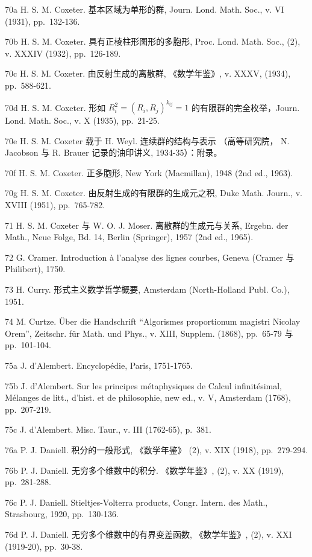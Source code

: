 70a H. S. M. Coxeter. 基本区域为单形的群, Journ. Lond. Math. Soc., v. VI (1931), pp.~132-136.

70b H. S. M. Coxeter. 具有正棱柱形图形的多胞形, Proc. Lond. Math. Soc., (2), v. XXXIV (1932), pp.~126-189.

70c H. S. M. Coxeter. 由反射生成的离散群, 《数学年鉴》, v. XXXV, (1934), pp.~588-621.

70d H. S. M. Coxeter. 形如 \(R_{i}^{2} = (R_{i}, R_{j})^{k_{ij}} = 1\) 的有限群的完全枚举，Journ. Lond. Math. Soc., v. X (1935), pp.~21-25.

70e H. S. M. Coxeter 载于 H. Weyl. 连续群的结构与表示 （高等研究院， N. Jacobson 与 R. Brauer 记录的油印讲义, 1934-35）：附录。

70f H. S. M. Coxeter. 正多胞形, New York (Macmillan), 1948 (2nd ed., 1963).

70g H. S. M. Coxeter. 由反射生成的有限群的生成元之积, Duke Math. Journ., v. XVIII (1951), pp.~765-782.

71 H. S. M. Coxeter 与 W. O. J. Moser. 离散群的生成元与关系, Ergebn. der Math., Neue Folge, Bd. 14, Berlin (Springer), 1957 (2nd ed., 1965).

72 G. Cramer. Introduction à l'analyse des lignes courbes, Geneva (Cramer 与 Philibert), 1750.

73 H. Curry. 形式主义数学哲学概要, Amsterdam (North-Holland Publ. Co.), 1951.

74 M. Curtze. Über die Handschrift ``Algorismes proportionum magistri Nicolay Orem'', Zeitschr. für Math. und Phys., v. XIII, Supplem. (1868), pp.~65-79 与 pp.~101-104.

75a J. d'Alembert. Encyclopédie, Paris, 1751-1765.

75b J. d'Alembert. Sur les principes métaphysiques de Calcul infinitésimal, Mélanges de litt., d'hist. et de philosophie, new ed., v. V, Amsterdam (1768), pp.~207-219.

75c J. d'Alembert. Misc. Taur., v. III (1762-65), p.~381.

76a P. J. Daniell. 积分的一般形式, 《数学年鉴》 (2), v. XIX (1918), pp.~279-294.

76b P. J. Daniell. 无穷多个维数中的积分. 《数学年鉴》, (2), v. XX (1919), pp.~281-288.

76c P. J. Daniell. Stieltjes-Volterra products, Congr. Intern. des Math., Strasbourg, 1920, pp.~130-136.

76d P. J. Daniell. 无穷多个维数中的有界变差函数, 《数学年鉴》, (2), v. XXI (1919-20), pp.~30-38.

